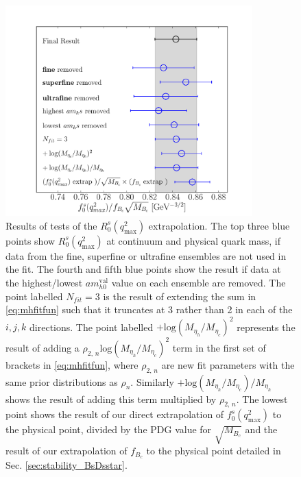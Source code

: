\begin{figure}[htb!]
  \begin{center}
  \hspace{-20pt}
  \includegraphics[width=0.85\textwidth]{images/BsDs/ratio/f0dcq2max_stability.pdf}
  \caption{ Results of tests of the $R_0^s(q^2_{\text{max}})$ extrapolation. The top three blue points show $R_0^s(q^2_{\text{max}})$ at continuum and physical quark mass, if data from the fine, superfine or ultrafine ensembles are not used in the fit. The fourth and fifth blue points show the result if data at the highest/lowest $am_{h0}^{\text{val}}$ value on each ensemble are removed. The point labelled $N_{fit}=3$ is the result of extending the sum in \eqref{eq:mhfitfun} such that it truncates at 3 rather than 2 in each of the $i,j,k$ directions. The point labelled $+\text{log}(M_{\eta_h}/M_{\eta_c})^2$ represents the result of adding a $\rho_{2,\,n} \text{log}(M_{\eta_h}/M_{\eta_c})^2$ term in the first set of brackets in \eqref{eq:mhfitfun}, where $\rho_{2,\,n}$ are new fit parameters with the same prior distributions as $\rho_{n}$. Similarly $+\text{log}(M_{\eta_h}/M_{\eta_c})/M_{\eta_h}$ shows the result of adding this term multiplied by $\rho_{2,\,n}$. The lowest point shows the result of our direct extrapolation of $f_0^s(q^2_{\text{max}})$ to the physical point, divided by the PDG value for $\sqrt{M_{B_c}}$ \cite{PhysRevD.98.030001} and the result of our extrapolation of $f_{B_c}$ to the physical point detailed in Sec. \ref{sec:stability_BsDsstar}.
    \label{fig:ratiotests}}
  \end{center}
\end{figure}

